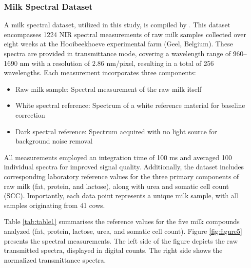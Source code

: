 \documentclass[10pt, a4paper, oneside]{article}
\begin{document}
\subsubsection{Milk Spectral Dataset}
A milk spectral dataset, utilized in this study, is compiled by \cite{diaz2023near}. This dataset encompasses 1224 NIR spectral measurements of raw milk samples collected over eight weeks at the Hooibeekhoeve experimental farm (Geel, Belgium). These spectra are provided in transmittance mode, covering a wavelength range of 960–1690 nm with a resolution of 2.86 nm/pixel, resulting in a total of 256 wavelengths. Each measurement incorporates three components:
\begin{itemize}
    \item Raw milk sample: Spectral measurement of the raw milk itself
    \item White spectral reference: Spectrum of a white reference material for baseline correction
    \item Dark spectral reference: Spectrum acquired with no light source for background noise removal
\end{itemize}
All measurements employed an integration time of 100 ms and averaged 100 individual spectra for improved signal quality. Additionally, the dataset includes corresponding laboratory reference values for the three primary components of raw milk (fat, protein, and lactose), along with urea and somatic cell count (SCC). Importantly, each data point represents a unique milk sample, with all samples originating from 41 cows.

Table \ref{tab:table1} summarises the reference values for the five milk compounds analyzed (fat, protein, lactose, urea, and somatic cell count). Figure \ref{fig:figure5} presents the spectral measurements. The left side of the figure depicts the raw transmitted spectra, displayed in digital counts. The right side shows the normalized transmittance spectra. 
\end{document}
